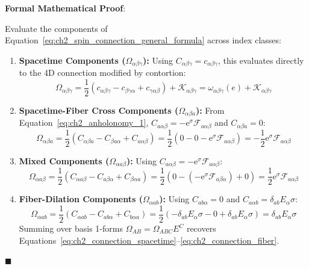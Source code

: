 \documentclass[
    12pt,
    a4paper,
    headings=normal,
    twoside=false,
    open=any,
    parskip=half
]{scrbook}
\newcommand{\eu}{\mathrm{e}}
\newenvironment{myproof}[1][]{%
  \par\vspace{6pt}\noindent\textbf{\sffamily\color{maincolor}Formal Mathematical Proof\ifstrempty{#1}{}{ (#1)}}:\par\nopagebreak
}{%
  \penalty50\hfill\ensuremath{\blacksquare}\par\vspace{6pt}
}
\begin{document}
\begin{myproof}
Evaluate the components of Equation~\eqref{eq:ch2_spin_connection_general_formula} across index classes:
\begin{enumerate}[label=\textbf{(\alph*)}, leftmargin=2em]
    \item \textbf{Spacetime Components ($\Omega_{\alpha\beta\gamma}$):}  
    Using $C_{\alpha\beta\gamma} = c_{\alpha\beta\gamma}$, this evaluates directly to the 4D connection modified by contortion:
    \begin{equation*}
    \Omega_{\alpha\beta\gamma} = \frac{1}{2}(c_{\alpha\beta\gamma} - c_{\beta\gamma\alpha} + c_{\gamma\alpha\beta}) + \mathcal{K}_{\alpha\beta\gamma} = \omega_{\alpha\beta\gamma}(e) + \mathcal{K}_{\alpha\beta\gamma}
    \end{equation*}
    \item \textbf{Spacetime-Fiber Cross Components ($\Omega_{\alpha\beta a}$):}  
    From Equation~\eqref{eq:ch2_anholonomy_1}, $C_{a\alpha\beta} = -\eu^\sigma \mathcal{F}_{a\alpha\beta}$ and $C_{\alpha\beta a} = 0$:
    \begin{equation*}
    \Omega_{\alpha\beta a} = \frac{1}{2}(C_{\alpha\beta a} - C_{\beta a\alpha} + C_{a\alpha\beta}) = \frac{1}{2}(0 - 0 - \eu^\sigma \mathcal{F}_{a\alpha\beta}) = -\frac{1}{2}\eu^\sigma \mathcal{F}_{a\alpha\beta}
    \end{equation*}
    \item \textbf{Mixed Components ($\Omega_{\alpha a\beta}$):}  
    Using $C_{a\alpha\beta} = -\eu^\sigma \mathcal{F}_{a\alpha\beta}$:
    \begin{equation*}
    \Omega_{\alpha a\beta} = \frac{1}{2}(C_{\alpha a\beta} - C_{a\beta\alpha} + C_{\beta\alpha a}) = \frac{1}{2}(0 - (-\eu^\sigma \mathcal{F}_{a\beta\alpha}) + 0) = \frac{1}{2}\eu^\sigma \mathcal{F}_{a\alpha\beta}
    \end{equation*}
    \item \textbf{Fiber-Dilation Components ($\Omega_{\alpha ab}$):}  
    Using $C_{ab\alpha} = 0$ and $C_{a\alpha b} = \delta_{ab} E_\alpha\sigma$:
    \begin{equation*}
    \Omega_{\alpha ab} = \frac{1}{2}(C_{\alpha ab} - C_{ab\alpha} + C_{b\alpha a}) = \frac{1}{2}(-\delta_{ab}E_\alpha\sigma - 0 + \delta_{ab}E_\alpha\sigma) = \delta_{ab} E_\alpha\sigma
    \end{equation*}
    Summing over basis 1-forms $\Omega_{AB} = \Omega_{ABC} E^C$ recovers Equations~\eqref{eq:ch2_connection_spacetime}--\eqref{eq:ch2_connection_fiber}.
\end{enumerate}
\end{myproof}
\end{document}
